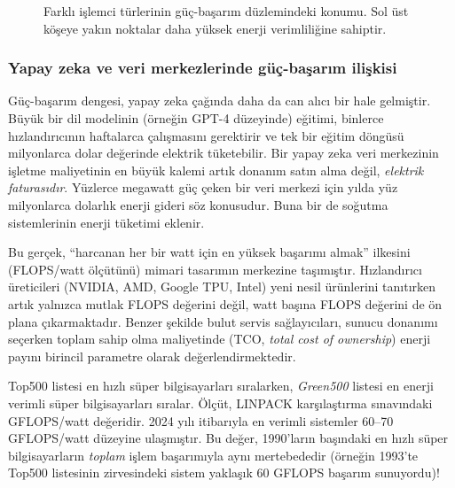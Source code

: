 \begin{figure}[H]
\caption[Farklı işlemci türlerinin güç-başarım düzlemindeki konumu]{Farklı işlemci türlerinin güç-başarım düzlemindeki konumu. Sol üst köşeye yakın noktalar daha yüksek enerji verimliliğine sahiptir.}
\label{fig:guc-basarim-dagilim}
\end{figure}

\subsubsection*{Yapay zeka ve veri merkezlerinde güç-başarım ilişkisi}
Güç-başarım dengesi, yapay zeka çağında daha da can alıcı bir hale gelmiştir. Büyük bir dil modelinin (örneğin GPT-4 düzeyinde) eğitimi, binlerce hızlandırıcının haftalarca çalışmasını gerektirir ve tek bir eğitim döngüsü milyonlarca dolar değerinde elektrik tüketebilir. Bir yapay zeka veri merkezinin işletme maliyetinin en büyük kalemi artık donanım satın alma değil, \emph{elektrik faturasıdır}. Yüzlerce megawatt güç çeken bir veri merkezi için yılda yüz milyonlarca dolarlık enerji gideri söz konusudur. Buna bir de soğutma sistemlerinin enerji tüketimi eklenir.

Bu gerçek, ``harcanan her bir watt için en yüksek başarımı almak'' ilkesini (FLOPS/watt ölçütünü) mimari tasarımın merkezine taşımıştır. Hızlandırıcı üreticileri (NVIDIA, AMD, Google TPU, Intel) yeni nesil ürünlerini tanıtırken artık yalnızca mutlak FLOPS değerini değil, watt başına FLOPS değerini de ön plana çıkarmaktadır. Benzer şekilde bulut servis sağlayıcıları, sunucu donanımı seçerken toplam sahip olma maliyetinde (TCO, \emph{total cost of ownership}) enerji payını birincil parametre olarak değerlendirmektedir.

\begin{bilginot}
Top500 listesi en hızlı süper bilgisayarları sıralarken, \emph{Green500} listesi en enerji verimli süper bilgisayarları sıralar. Ölçüt, LINPACK karşılaştırma sınavındaki GFLOPS/watt değeridir. 2024 yılı itibarıyla en verimli sistemler 60--70 GFLOPS/watt düzeyine ulaşmıştır. Bu değer, 1990'ların başındaki en hızlı süper bilgisayarların \emph{toplam} işlem başarımıyla aynı mertebededir (örneğin 1993'te Top500 listesinin zirvesindeki sistem yaklaşık 60 GFLOPS başarım sunuyordu)!
\end{bilginot}


